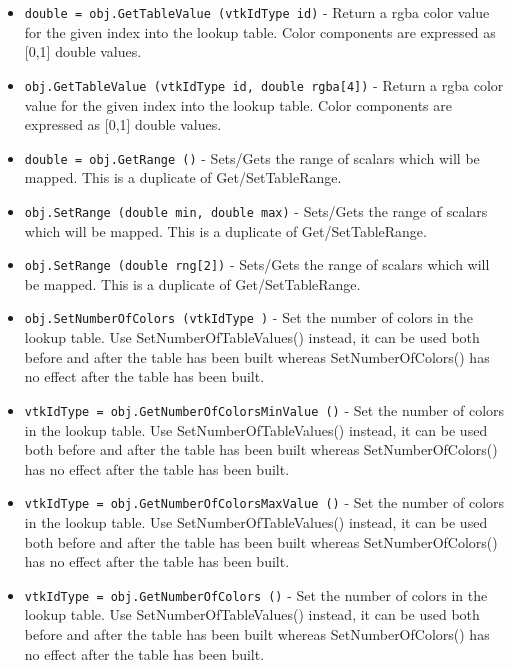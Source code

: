 \begin{itemize}
\item  \verb|double = obj.GetTableValue (vtkIdType id)| -  Return a rgba color value for the given index into the lookup table. Color
 components are expressed as [0,1] double values.

\item  \verb|obj.GetTableValue (vtkIdType id, double rgba[4])| -  Return a rgba color value for the given index into the lookup table. Color
 components are expressed as [0,1] double values.

\item  \verb|double = obj.GetRange ()| -  Sets/Gets the range of scalars which will be mapped.  This is a duplicate
 of Get/SetTableRange.

\item  \verb|obj.SetRange (double min, double max)| -  Sets/Gets the range of scalars which will be mapped.  This is a duplicate
 of Get/SetTableRange.

\item  \verb|obj.SetRange (double rng[2])| -  Sets/Gets the range of scalars which will be mapped.  This is a duplicate
 of Get/SetTableRange.

\item  \verb|obj.SetNumberOfColors (vtkIdType )| -  Set the number of colors in the lookup table.  Use
 SetNumberOfTableValues() instead, it can be used both before and
 after the table has been built whereas SetNumberOfColors() has no
 effect after the table has been built.

\item  \verb|vtkIdType = obj.GetNumberOfColorsMinValue ()| -  Set the number of colors in the lookup table.  Use
 SetNumberOfTableValues() instead, it can be used both before and
 after the table has been built whereas SetNumberOfColors() has no
 effect after the table has been built.

\item  \verb|vtkIdType = obj.GetNumberOfColorsMaxValue ()| -  Set the number of colors in the lookup table.  Use
 SetNumberOfTableValues() instead, it can be used both before and
 after the table has been built whereas SetNumberOfColors() has no
 effect after the table has been built.

\item  \verb|vtkIdType = obj.GetNumberOfColors ()| -  Set the number of colors in the lookup table.  Use
 SetNumberOfTableValues() instead, it can be used both before and
 after the table has been built whereas SetNumberOfColors() has no
 effect after the table has been built.


\end{itemize}
